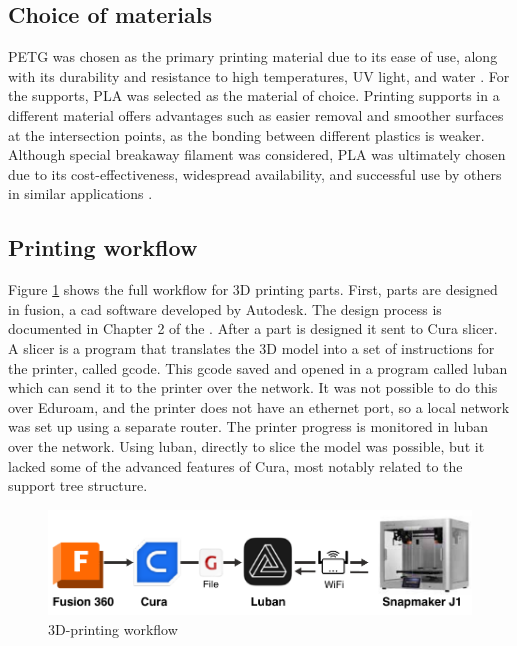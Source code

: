 \subsection{Choice of materials}
PETG was chosen as the primary printing material due to its ease of use, along with its durability and resistance to high temperatures, UV light, and water \cite{oconnellPETGVsPLA2023}.
For the supports, PLA was selected as the material of choice.
Printing supports in a different material offers advantages such as easier removal and smoother surfaces at the intersection points, as the bonding between different plastics is weaker.
Although special breakaway filament was considered, PLA was ultimately chosen due to its cost-effectiveness, widespread availability, and successful use by others in similar applications \cite{SupportFilamentPETG2023}.

\subsection{Printing workflow}
Figure \ref{fig:3dp_workflow} shows the full workflow for 3D printing parts.
First, parts are designed in \gls{fusion}, a \gls{cad} software developed by Autodesk.
The design process is documented in Chapter 2 of the \preproject.
After a part is designed it sent to Cura slicer.
A slicer is a program that translates the 3D model into a set of instructions for the printer, called \gls{gcode}.
This \gls{gcode} saved and opened in a program called \gls{luban} which can send it to the printer over the network.
It was not possible to do this over Eduroam, and the printer does not have an ethernet port, so a local network was set up using a separate router.
The printer progress is monitored in \gls{luban} over the network.
Using \gls{luban}, directly to slice the model was possible, but it lacked some of the advanced features of Cura, most notably related to the support tree structure.


\begin{figure}[H]
    \centering
    \includegraphics[width=\textwidth]{figures/3d_print/pipeline.pdf}
    \caption{3D-printing workflow \cite{autodeskFusion360Logo} \cite{delaragoCuraLogo2022} \cite{jupi007GcodeIconProposal2020} \cite{snapmakerSnapmakerLogo2020} \cite{snapmakerSnapmakerJ1High}}
    \label{fig:3dp_workflow}
\end{figure}

